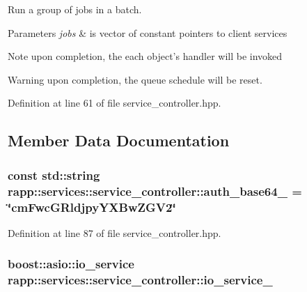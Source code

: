 Run a group of jobs in a batch. 


\begin{DoxyParams}{Parameters}
{\em jobs} & is vector of constant pointers to client services \\
\hline
\end{DoxyParams}
\begin{DoxyNote}{Note}
upon completion, the each object's handler will be invoked 
\end{DoxyNote}
\begin{DoxyWarning}{Warning}
upon completion, the queue schedule will be reset. 
\end{DoxyWarning}


Definition at line 61 of file service\-\_\-controller.\-hpp.



\subsection{Member Data Documentation}
\hypertarget{classrapp_1_1services_1_1service__controller_abce9746f68bc23fa140453e7af539bee}{
\subsubsection[{auth\-\_\-base64\-\_\-}]{\setlength{\rightskip}{0pt plus 5cm}const std\-::string rapp\-::services\-::service\-\_\-controller\-::auth\-\_\-base64\-\_\- = \char`\"{}cm\-Fwc\-G\-Rldjpy\-Y\-X\-Bw\-Z\-G\-V2\char`\"{}\hspace{0.3cm}{\ttfamily [private]}}}\label{classrapp_1_1services_1_1service__controller_abce9746f68bc23fa140453e7af539bee}


Definition at line 87 of file service\-\_\-controller.\-hpp.

\hypertarget{classrapp_1_1services_1_1service__controller_a83182ff1f01ebf6df3c9504638141f3b}{
\subsubsection[{io\-\_\-service\-\_\-}]{\setlength{\rightskip}{0pt plus 5cm}boost\-::asio\-::io\-\_\-service rapp\-::services\-::service\-\_\-controller\-::io\-\_\-service\-\_\-\hspace{0.3cm}{\ttfamily [private]}}}\label{classrapp_1_1services_1_1service__controller_a83182ff1f01ebf6df3c9504638141f3b}


